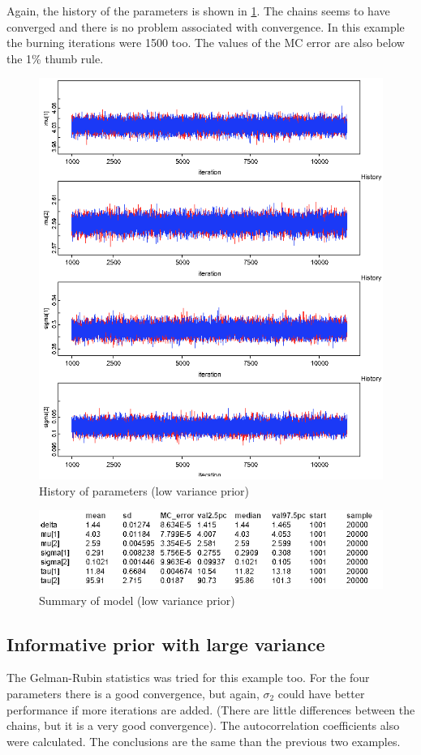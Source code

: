 \documentclass{article}
\begin{document}
\pagebreak

Again, the history of the parameters is shown in \cref{fig:fig9}. The chains seems to have converged and there is no problem associated with convergence. In this example the burning iterations were 1500 too. The values of the MC error are also below the 1\% thumb rule.

\begin{figure}[ht!]
  \centering
  \includegraphics[width=.8\textwidth]{imgs/Inf_low_hist.png}
  \caption{History of parameters (low variance prior)}
  \label{fig:fig9}
\end{figure}

\begin{figure}[ht!]
  \centering
  \includegraphics[width=.8\textwidth]{imgs/Inf_low_table.png}
  \caption{Summary of model (low variance prior)}
  \label{fig:fig10}
\end{figure}

\pagebreak

\subsection{Informative prior with large variance}
The Gelman-Rubin statistics was tried for this example too. For the four parameters there is a good convergence, but again, $\sigma_2$ could have better performance if more iterations are added. (There are little differences between the chains, but it is a very good convergence). The autocorrelation coefficients also were calculated. The conclusions are the same than the previous two examples.
\end{document}
